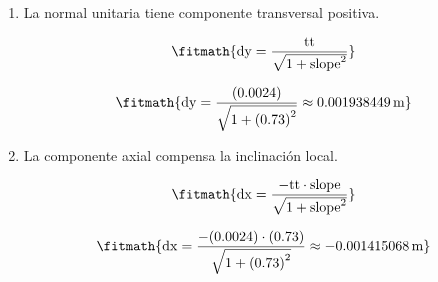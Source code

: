 \begin{enumerate}

\item La normal unitaria tiene componente transversal positiva.

\[\fitmath{\mathrm{dy}=\frac{\mathrm{tt}}{\sqrt{1+{\mathrm{slope}}^{2}}}}\]

\[\fitmath{\mathrm{dy}=\frac{(0.0024)}{\sqrt{1+{(0.73)}^{2}}}\approx 0.001938449\,\mathrm{m}}\]

\item La componente axial compensa la inclinación local.

\[\fitmath{\mathrm{dx}=\frac{-\mathrm{tt}\cdot \mathrm{slope}}{\sqrt{1+{\mathrm{slope}}^{2}}}}\]

\[\fitmath{\mathrm{dx}=\frac{-(0.0024)\cdot (0.73)}{\sqrt{1+{(0.73)}^{2}}}\approx -0.001415068\,\mathrm{m}}\]

\end{enumerate}
